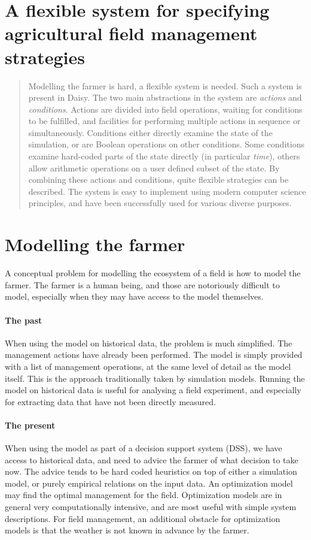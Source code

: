 \documentclass[a4paper]{article}
\begin{document}
\section*{A flexible system for specifying agricultural field management strategies}

\begin{abstract}
  Modelling the farmer is hard, a flexible system is needed.  Such a
  system is present in Daisy.  The two main abstractions in the system
  are \emph{actions} and \emph{conditions}. Actions are divided into
  field operations, waiting for conditions to be fulfilled, and
  facilities for performing multiple actions in sequence or
  simultaneously.  Conditions either directly examine the state of the
  simulation, or are Boolean operations on other conditions.  Some
  conditions examine hard-coded parts of the state directly (in
  particular \emph{time}), others allow arithmetic operations on a
  user defined subset of the state.  By combining these actions and
  conditions, quite flexible strategies can be described.  The system
  is easy to implement using modern computer science principles, and
  have been successfully used for various diverse purposes.
\end{abstract}


\section{Modelling the farmer}

A conceptual problem for modelling the ecosystem of a field is how to
model the farmer.  The farmer is a human being, and those are
notoriously difficult to model, especially when they may have access
to the model themselves.

\paragraph{The past} When using the model on historical data, the
problem is much simplified.  The management actions have already been
performed.  The model is simply provided with a list of management
operations, at the same level of detail as the model itself.  This is
the approach traditionally taken by simulation models.  Running the
model on historical data is useful for analysing a field experiment, and
especially for extracting data that have not been directly measured.

\paragraph{The present} When using the model as part of a decision
support system (DSS), we have access to historical data, and need to
advice the farmer of what decision to take now.  The advice tends to
be hard coded heuristics on top of either a simulation model, or
purely empirical relations on the input data.  An optimization model
may find the optimal management for the field.  Optimization models
are in general very computationally intensive, and are most useful
with simple system descriptions.  For field management, an additional
obstacle for optimization models is that the weather is not known in
advance by the farmer.
\end{document}
